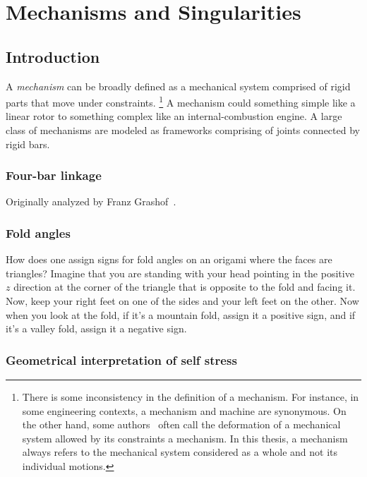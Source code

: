 
\chapter{Mechanisms and Singularities}

\section{Introduction}

A \emph{mechanism} can be broadly defined as a mechanical system comprised of rigid parts that move under constraints.%
\footnote{There is some inconsistency in the definition of a mechanism.
  For instance, in some engineering contexts, a mechanism and machine are synonymous.
  On the other hand, some authors~\cite{connelly2015,rocklin2018} often call the deformation of a mechanical system allowed by its constraints a mechanism.
In this thesis, a mechanism always refers to the mechanical system considered as a whole and not its individual motions.}
A mechanism could something simple like a linear rotor to something complex like an internal-combustion engine.
A large class of mechanisms are modeled as frameworks comprising of joints connected by rigid bars.

\subsection{Four-bar linkage}

Originally analyzed by Franz Grashof~\cite[pp.~113--118]{grashof1883}.

\subsection{Fold angles}

How does one assign signs for fold angles on an origami where the faces are triangles?
Imagine that you are standing with your head pointing in the positive $z$ direction at the corner of the triangle that is opposite to the fold and facing it.
Now, keep your right feet on one of the sides and your left feet on the other.
Now when you look at the fold, if it's a mountain fold, assign it a positive sign, and if it's a valley fold, assign it a negative sign.

\subsection{Geometrical interpretation of self stress}

